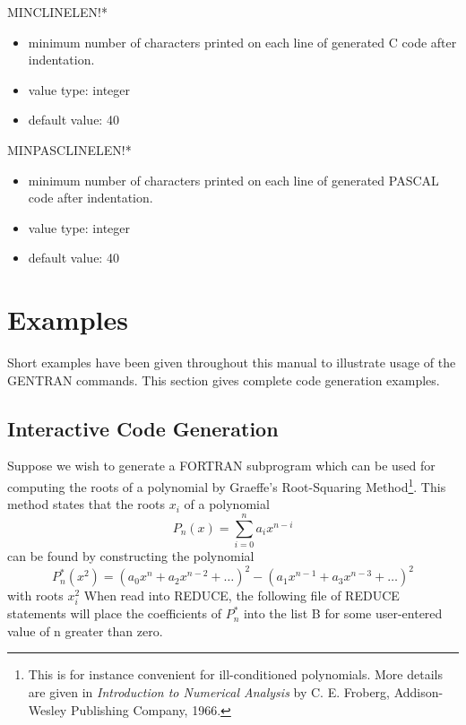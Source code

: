 \begin{describe}{MINCLINELEN!*}
\begin{itemize}
\item minimum number of characters printed on each line of generated C
code after indentation.
\item value type:  integer
\item default value:  40
\end{itemize} 
\end{describe}

\begin{describe}{MINPASCLINELEN!*}
\begin{itemize}
\item minimum number of characters printed on each line of generated PASCAL
code after indentation.
\item value type:  integer
\item default value:  40
\end{itemize} 
\end{describe} 

\section{Examples}\label{GENTRAN:examples}

Short examples have been given throughout this manual to illustrate
usage of the GENTRAN commands.  This section gives complete code
generation examples.

\subsection{Interactive Code Generation} 
Suppose we wish to generate a FORTRAN subprogram which can be used for
computing the roots of a polynomial by Graeffe's Root-Squaring Method\footnote{
This is for instance convenient for ill-conditioned polynomials.  More
details are given in {\it Introduction to Numerical Analysis\/} by
C. E. Froberg, Addison-Wesley Publishing Company, 1966.}. This
method states that the roots $x_i$ of a polynomial
$$P_n(x) = \sum_{i=0}^{n}{a_i x^{n-i}} $$
can be found by constructing the polynomial
$$P^{*}_n\left({x^2}\right) = \left( a_0x^n + a_2x^{n-2} + \dots\right)^2 -
\left( a_1x^{n-1} + a_3x^{n-3} + \dots\right)^2$$
with roots $x_i^2$
When read into REDUCE, the following file of REDUCE statements
will place the coefficients of $P^{*}_n$
into the list B for some user-entered value of n greater than zero.

